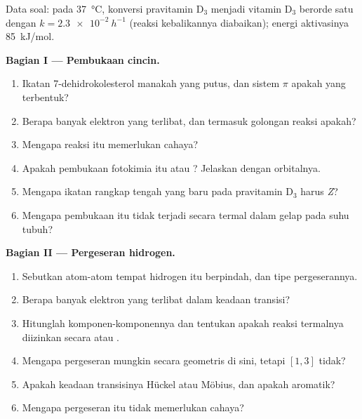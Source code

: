 \begin{problem}
\label{pb:b3:pericyclic:1}
Data soal: pada \qty{37}{\celsius}, konversi pravitamin D$_3$ menjadi vitamin D$_3$ berorde
satu dengan $k = \qty{2.3e-2}{h^{-1}}$ (reaksi kebalikannya diabaikan); energi aktivasinya
\qty{85}{kJ/mol}.

\medskip\noindent\textbf{Bagian I --- Pembukaan cincin.}
\begin{enumerate}[beginpenalty=10000]
  \item Ikatan 7-dehidrokolesterol manakah yang putus, dan sistem $\pi$ apakah yang terbentuk?
  \item Berapa banyak elektron yang terlibat, dan termasuk golongan reaksi apakah?
  \item Mengapa reaksi itu memerlukan cahaya?
  \item Apakah pembukaan fotokimia itu  atau ? Jelaskan dengan orbitalnya.
  \item Mengapa ikatan rangkap tengah yang baru pada pravitamin D$_3$ harus \textit{Z}?
  \item Mengapa pembukaan itu tidak terjadi secara termal dalam gelap pada suhu tubuh?
\end{enumerate}

\medskip\noindent\textbf{Bagian II --- Pergeseran hidrogen.}
\begin{enumerate}[resume, beginpenalty=10000]
  \item Sebutkan atom-atom tempat hidrogen itu berpindah, dan tipe pergeserannya.
  \item Berapa banyak elektron yang terlibat dalam keadaan transisi?
  \item Hitunglah komponen-komponennya dan tentukan apakah reaksi termalnya diizinkan
        secara  atau .
  \item Mengapa pergeseran  mungkin secara geometris di sini, tetapi $[1,3]$ tidak?
  \item Apakah keadaan transisinya Hückel atau Möbius, dan apakah aromatik?
  \item Mengapa pergeseran itu tidak memerlukan cahaya?
\end{enumerate}


\end{problem}
